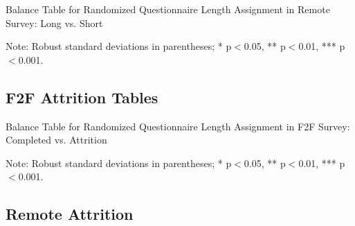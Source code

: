 \documentclass[11pt,harvard]{article}
\begin{document}
	
	\begin{table}[htbp]
		\centering
		\begin{adjustbox}{max width=\textwidth}
			\begin{threeparttable}
				\caption{Balance Table for Randomized Questionnaire Length Assignment in Remote Survey: Long vs. Short}
				\small
				 
				\label{tab:BF_Listing_Demo_Balance_RM_Length}
				\begin{tablenotes}
					\item Note: Robust standard deviations in parentheses; * p$<$0.05, ** p$<$0.01, *** p$<$0.001.
				\end{tablenotes}
			\end{threeparttable}
		\end{adjustbox}
	\end{table}
	
	\pagebreak
	
	\subsection{F2F Attrition Tables}
	
	\begin{table}[htbp]
		\centering
		\begin{adjustbox}{max width=\textwidth}
			\begin{threeparttable}
				\caption{Balance Table for Randomized Questionnaire Length Assignment in F2F Survey: Completed vs. Attrition}
				\small
				 
				\label{tab:BF_Listing_Demo_Attrition_F2F}
				\begin{tablenotes}
					\item Note: Robust standard deviations in parentheses; * p$<$0.05, ** p$<$0.01, *** p$<$0.001.
				\end{tablenotes}
			\end{threeparttable}
		\end{adjustbox}
	\end{table}
	
	\pagebreak
	
	\subsection{Remote Attrition}
	
\end{document}
